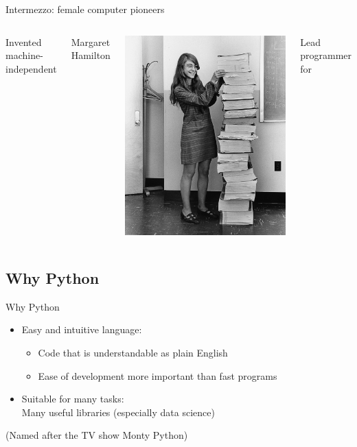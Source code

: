 \documentclass[aspectratio=169,usenames,dvipsnames]{beamer}
\begin{document}
\begin{frame}{Intermezzo: female computer pioneers}
\begin{columns}
		Invented machine-independent 

		\pause
		Margaret Hamilton %

		\vspace{1ex}
		\includegraphics[width=0.9\linewidth]{fig/margarethamilton}

		Lead programmer for 
	\end{columns}
\end{frame}

\subsection{Why Python}
\frame{\tableofcontents[currentsubsection]}
\begin{frame}{Why Python}
    \begin{itemize}
        \item Easy and intuitive language:
            \begin{itemize}
                \item Code that is understandable as plain English
                \item Ease of development more important than fast programs
            \end{itemize}
        \item Suitable for many tasks:\\
            Many useful libraries (especially data science)
    \end{itemize}

    (Named after the TV show Monty Python)
\end{frame}
\end{document}

